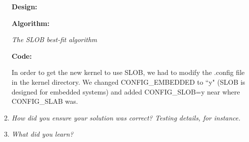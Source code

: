 \documentclass[letterpaper,10pt,titlepage]{article}
\newcommand{\tab}{\hspace*{2em}} %
\begin{document}
\begin{enumerate}
\newline
\textbf{Design:} 

\newline
\textbf{Algorithm:} 

\tab \emph{The SLOB best-fit algorithm} 


\newline
\textbf{Code:}

\tab In order to get the new kernel to use SLOB, we had to modify the .config file in the kernel directory. We changed CONFIG_EMBEDDED to ``y" (SLOB is designed for embedded systems) and added CONFIG_SLOB=y near where CONFIG_SLAB was.


\newline
\item \emph{How did you ensure your solution was correct? Testing details, for instance.}

\newline
\item \emph{What did you learn?}

\end{enumerate}

%
\end{document}

